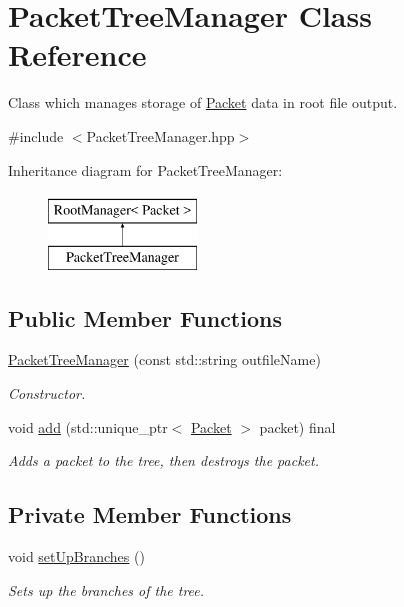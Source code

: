 \hypertarget{class_packet_tree_manager}{}\section{Packet\+Tree\+Manager Class Reference}
\label{class_packet_tree_manager}


Class which manages storage of \hyperlink{class_packet}{Packet} data in root file output.  




{\ttfamily \#include $<$Packet\+Tree\+Manager.\+hpp$>$}

Inheritance diagram for Packet\+Tree\+Manager\+:\begin{figure}[H]
\begin{center}
\leavevmode
\includegraphics[height=2.000000cm]{class_packet_tree_manager}
\end{center}
\end{figure}
\subsection*{Public Member Functions}
\begin{DoxyCompactItemize}
\item 
\hyperlink{class_packet_tree_manager_acab253ad1d9eb8d7b316d05f52bd064e}{Packet\+Tree\+Manager} (const std\+::string outfile\+Name)
\begin{DoxyCompactList}\small\item\em Constructor. \end{DoxyCompactList}\item 
void \hyperlink{class_packet_tree_manager_a855e71512fe6365c11f312584afff70a}{add} (std\+::unique\+\_\+ptr$<$ \hyperlink{class_packet}{Packet} $>$ packet) final
\begin{DoxyCompactList}\small\item\em Adds a packet to the tree, then destroys the packet. \end{DoxyCompactList}\end{DoxyCompactItemize}
\subsection*{Private Member Functions}
\begin{DoxyCompactItemize}
\item 
void \hyperlink{class_packet_tree_manager_a3e2aa24c5acd8a87b15cfff2d011f30b}{set\+Up\+Branches} ()
\begin{DoxyCompactList}\small\item\em Sets up the branches of the tree. \end{DoxyCompactList}\end{DoxyCompactItemize}
